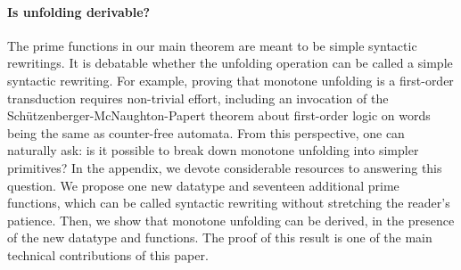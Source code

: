 \paragraph*{Is unfolding derivable?} The  prime functions in our main theorem  are meant to be simple syntactic rewritings. It is debatable whether the  unfolding operation can be called a simple syntactic rewriting. For example, proving that monotone unfolding is a first-order transduction requires non-trivial effort, including an invocation of the Sch\"utzenberger-McNaughton-Papert theorem about first-order logic on words being the same as counter-free automata. From this perspective, one can naturally ask: is it possible to break down monotone unfolding into simpler primitives?
In the appendix, we devote considerable resources to answering this question. We propose one new  datatype
and seventeen additional prime functions, which can be called syntactic rewriting without stretching the reader's patience. Then, we show that monotone unfolding can be derived, in the presence of  the new datatype and functions. The proof of this result is one of the main technical contributions of this paper.


